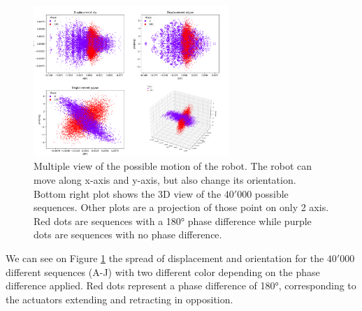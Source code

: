         \begin{figure}[h]
            \centering
            \includegraphics[width=0.66\textwidth]{images/displacement_spread.png}
            \caption{Multiple view of the possible motion of the robot. The robot can move along x-axis and y-axis, but also change its orientation. Bottom right plot shows the 3D view of the $40'000$ possible sequences. Other plots are a projection of those point on only 2 axis. Red dots are sequences with a 180° phase difference while purple dots are sequences with no phase difference.}
            \label{fig:displacement_spread}
        \end{figure}
        
        We can see on Figure \ref{fig:displacement_spread} the spread of displacement and orientation for the $40'000$ different sequences (A-J) with two different color depending on the phase difference applied. Red dots represent a phase difference of 180°, corresponding to the actuators extending and retracting in opposition.
        
